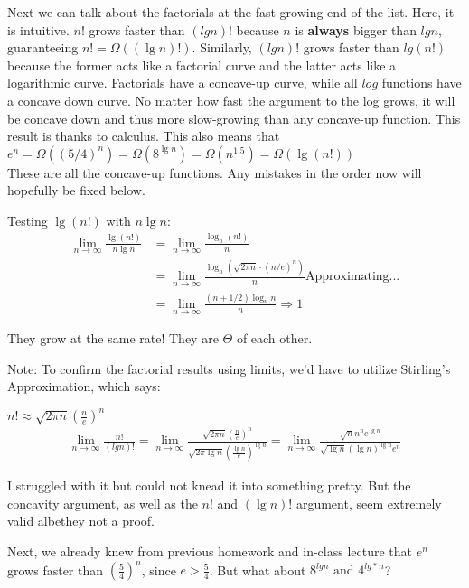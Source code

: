 \documentclass[12pt]{article}
\begin{document}
\begin{enumerate}
Next we can talk about the factorials at the fast-growing end of the list. Here, it is intuitive. $n!$ grows faster than $(lgn)!$ because $n$ is \textbf{always} bigger than $lgn$, guaranteeing $n! = \Omega((\lg n)!)$. Similarly, $(lgn)!$ grows faster than $lg(n!)$ because the former acts like a factorial curve and the latter acts like a logarithmic curve. Factorials have a concave-up curve, while all $log$ functions have a concave down curve. No matter how fast the argument to the log grows, it will be concave down and thus more slow-growing than any concave-up function. This result is thanks to calculus. This also means that $e^n = \Omega((5/4)^n) = \Omega(8^{\lg n}) = \Omega(n^{1.5}) = \Omega(\lg (n!))$\\
These are all the concave-up functions. Any mistakes in the order now will hopefully be fixed below.

Testing $\lg (n!)$ with $n\lg n$:
\begin{align*}
\lim\limits_{n\to\infty}\frac{\lg (n!)}{n\lg n} &= \lim\limits_{n\to\infty}\frac{\log_n (n!)}{n}\\
&= \lim\limits_{n\to\infty}\frac{\log_n(\sqrt{2\pi n}\cdot (n/e)^n)}{n} \text{Approximating...}\\
&= \lim\limits_{n\to\infty} \frac{(n+1/2)\log_n n}{n} \Longrightarrow \boxed{1}
\end{align*}

They grow at the same rate! They are $\Theta$ of each other.

Note: To confirm the factorial results using limits, we'd have to utilize Stirling's Approximation, which says:\\
\begin{center}
	$n! \approx \sqrt{2\pi n}(\frac{n}{e})^n$ \\
	\begin{align*}
		\lim\limits_{n\to\infty}\frac{n!}{(lgn)!} = 	\lim\limits_{n\to\infty}\frac{\sqrt{2\pi n}(\frac{n}{e})^n}{\sqrt{2\pi \lg n}(\frac{\lg n}{e})^{\lg n}} = \lim\limits_{n\to\infty}\frac{\sqrt{n}n^ne^{\lg n}}{\sqrt{\lg n}({\lg n})^{\lg n}e^n}
	\end{align*}
\end{center}
I struggled with it but could not knead it into something pretty. But the concavity argument, as well as the $n!$ and $(\lg n)!$ argument, seem extremely valid albethey not a proof.

Next, we already knew from previous homework and in-class lecture that $e^n$ grows faster than $\left(\frac{5}{4}\right)^n$, since $e > \frac{5}{4}$. But what about $8^{lgn} \text{ and } 4^{lg*n}$?


\end{enumerate}
\end{document}
